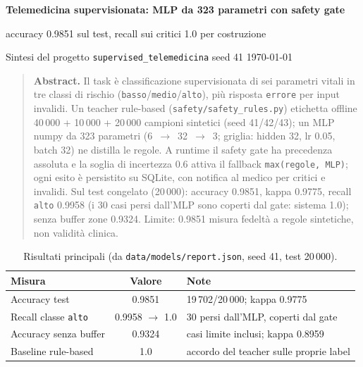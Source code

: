 \documentclass[11pt,a4paper]{article}
\newcommand{\codice}[1]{\texttt{#1}}
\newcommand{\file}[1]{\texttt{#1}}
\begin{document}
\begin{center}
{\Large\bf Telemedicina supervisionata: MLP da 323 parametri con safety gate\par}
{\large accuracy 0.9851 sul test, recall sui critici 1.0 per costruzione\par}
\vspace{4pt}
{\normalsize Sintesi del progetto \file{supervised\_telemedicina} \quad\textbullet\quad seed 41 \quad\textbullet\quad \today\par}
\end{center}

\begin{quote}\small
\textbf{Abstract.} Il task è classificazione supervisionata di sei parametri
vitali in tre classi di rischio (\codice{basso}/\codice{medio}/\codice{alto}),
più risposta \codice{errore} per input invalidi. Un teacher rule-based
(\file{safety/safety\_rules.py}) etichetta offline 40\,000 + 10\,000 + 20\,000
campioni sintetici (seed 41/42/43); un MLP numpy da 323 parametri (6~$\to$~32~$\to$~3;
griglia: hidden 32, lr 0.05, batch 32) ne distilla le regole. A runtime il
safety gate ha precedenza assoluta e la soglia di incertezza 0.6 attiva il
fallback \codice{max(regole, MLP)}; ogni esito è persistito su SQLite, con
notifica al medico per critici e invalidi. Sul test congelato (20\,000):
accuracy 0.9851, kappa 0.9775, recall \codice{alto} 0.9958 (i 30 casi persi
dall'MLP sono coperti dal gate: sistema 1.0); senza buffer zone 0.9324.
Limite: 0.9851 misura fedeltà a regole sintetiche, non validità clinica.
\end{quote}

\begin{table}[h]
\centering
\caption{Risultati principali (da \file{data/models/report.json}, seed 41, test 20\,000).}
\label{tab:ris}
\begin{tabular}{lcl}
\toprule
\textbf{Misura} & \textbf{Valore} & \textbf{Note} \\
\midrule
Accuracy test & 0.9851 & 19\,702/20\,000; kappa 0.9775 \\
Recall classe \codice{alto} & 0.9958 $\to$ 1.0 & 30 persi dall'MLP, coperti dal gate \\
Accuracy senza buffer & 0.9324 & casi limite inclusi; kappa 0.8959 \\
Baseline rule-based & 1.0 & accordo del teacher sulle proprie label \\
\bottomrule
\end{tabular}
\end{table}
\end{document}
